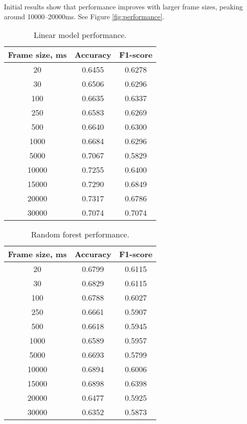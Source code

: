 \documentclass[conference]{IEEEtran}
\begin{document}
Initial results show that performance improves with larger frame sizes, peaking around 10000–20000ms. See Figure \ref{fig:performance}.


\begin{table}[h]
\centering
\caption{Linear model performance.}
\begin{tabular}{|c|c|c|}
\hline
\textbf{Frame size, ms} & \textbf{Accuracy} & \textbf{F1-score}\\
\hline
20 & 0.6455 & 0.6278 \\
\hline
30 & 0.6506 & 0.6296 \\
\hline
100 & 0.6635 & 0.6337 \\
\hline
250 & 0.6583 & 0.6269 \\
\hline
500 & 0.6640 & 0.6300 \\
\hline
1000 & 0.6684 & 0.6296 \\
\hline
5000 & 0.7067 & 0.5829 \\
\hline
10000 & 0.7255 & 0.6400 \\
\hline
15000 & 0.7290 & 0.6849 \\
\hline
20000 & 0.7317 & 0.6786 \\
\hline
30000 & 0.7074 & 0.7074 \\
\hline
\end{tabular}
\label{tab:linear_model_perf}
\end{table}


\begin{table}[h]
\centering
\caption{Random forest performance.}
\begin{tabular}{|c|c|c|}
\hline
\textbf{Frame size, ms} & \textbf{Accuracy} & \textbf{F1-score}\\
\hline
20 & 0.6799 & 0.6115 \\
\hline
30 & 0.6829 & 0.6115 \\
\hline
100 & 0.6788 & 0.6027 \\
\hline
250 & 0.6661 & 0.5907 \\
\hline
500 & 0.6618 & 0.5945 \\
\hline
1000 & 0.6589 & 0.5957 \\
\hline
5000 & 0.6693 & 0.5799 \\
\hline
10000 & 0.6894 & 0.6006 \\
\hline
15000 & 0.6898 & 0.6398 \\
\hline
20000 & 0.6477 & 0.5925 \\
\hline
30000 & 0.6352 & 0.5873 \\
\hline
\end{tabular}
\label{tab:random_forest_perf}
\end{table}
\end{document}
